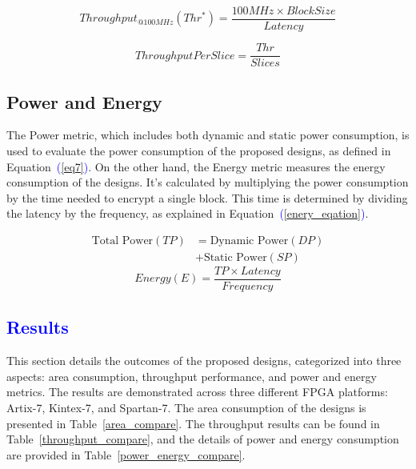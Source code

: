 \documentclass[final,5p,times,twocolumn]{elsarticle}
\begin{document}
\begin{equation}
    Throughput_{@100MHz}(Thr^*) = \frac{100MHz \times Block Size}{Latency}
    \label{eq5}
\end{equation}

\begin{equation}
    ThroughputPerSlice = \frac{Thr}{Slices}
    \label{eq6}
\end{equation}

\subsection{Power and Energy}\label{power_energy}

The Power metric, which includes both dynamic and static power consumption, is used to evaluate the power consumption of the proposed designs, as defined in Equation~\textcolor{blue}{(\ref{eq7})}.
On the other hand, the Energy metric measures the energy consumption of the designs. It's calculated by multiplying the power consumption by the time needed to encrypt a single block. This time is determined by dividing the latency by the frequency, as explained in Equation~\textcolor{blue}{(\ref{enery_eqation})}.

\begin{align}
    \text{Total Power} (TP) & = \text{Dynamic Power} (DP) \nonumber \\
                            & + \text{Static Power} (SP)
    \label{eq7}
\end{align}
\begin{equation}
    Energy(E) = \frac{TP \times Latency }{Frequency}
    \label{enery_eqation}
\end{equation}


\subsection{\textcolor{blue}{Results}}\label{sec5}

This section details the outcomes of the proposed designs, categorized into three aspects: area consumption, throughput performance, and power and energy metrics.
The results are demonstrated across three different FPGA platforms: Artix-7, Kintex-7, and Spartan-7.
The area consumption of the designs is presented in Table~\ref{area_compare}. The throughput results can be found in Table~\ref{throughput_compare}, and the details of power and energy consumption are provided in Table~\ref{power_energy_compare}.
\end{document}
